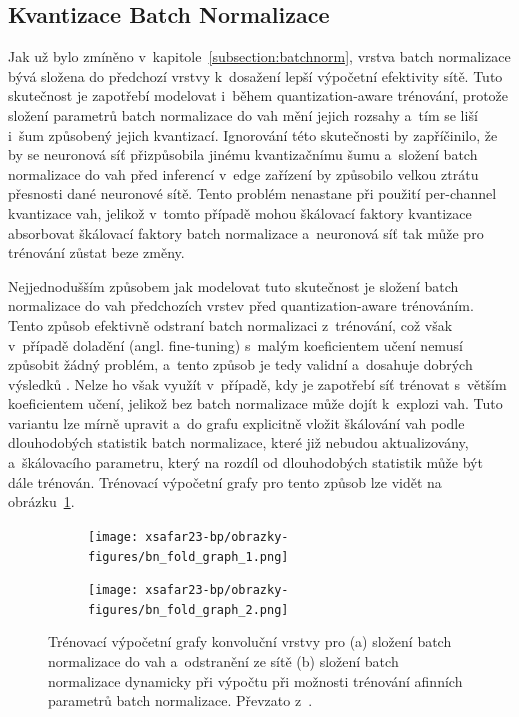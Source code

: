\subsection{Kvantizace Batch Normalizace}
\label{section:qat-batch-norm}

Jak už bylo zmíněno v~kapitole~\ref{subsection:batchnorm}, vrstva batch normalizace bývá složena do předchozí vrstvy k~dosažení lepší výpočetní efektivity sítě. Tuto skutečnost je zapotřebí modelovat i~během quantization-aware trénování, protože složení parametrů batch normalizace do vah mění jejich rozsahy a~tím se liší i~šum způsobený jejich kvantizací. Ignorování této skutečnosti by zapříčinilo, že by se neuronová síť přizpůsobila jinému kvantizačnímu šumu a~složení batch normalizace do vah před inferencí v~edge zařízení by způsobilo velkou ztrátu přesnosti dané neuronové sítě. Tento problém nenastane při použití per-channel kvantizace vah, jelikož v~tomto případě mohou škálovací faktory kvantizace absorbovat škálovací faktory batch normalizace \cite{nagel2021white} a~neuronová síť tak může pro trénování zůstat beze změny.

Nejjednodušším způsobem jak modelovat tuto skutečnost je složení batch normalizace do vah předchozích vrstev před quantization-aware trénováním. Tento způsob efektivně odstraní batch normalizaci z~trénování, což však v~případě doladění (angl. fine-tuning) s~malým koeficientem učení nemusí způsobit žádný problém, a~tento způsob je tedy validní a~dosahuje dobrých výsledků \cite{nagel2021white}. Nelze ho však využít v~případě, kdy je zapotřebí síť trénovat s~větším koeficientem učení, jelikož bez batch normalizace může dojít k~explozi vah. Tuto variantu lze mírně upravit a~do grafu explicitně vložit škálování vah podle dlouhodobých statistik batch normalizace, které již nebudou aktualizovány, a~škálovacího parametru, který na rozdíl od dlouhodobých statistik může být dále trénován. Trénovací výpočetní grafy pro tento způsob lze vidět na obrázku~\ref{fig:batch_fold_quant_static}.

\begin{figure}[H]
\centering
\begin{subfigure}{.45\linewidth}
\centering
\texttt{[image: xsafar23-bp/obrazky-figures/bn\_fold\_graph\_1.png]}
\caption[short]{}
\end{subfigure}
\begin{subfigure}{.45\linewidth}
\centering
\texttt{[image: xsafar23-bp/obrazky-figures/bn\_fold\_graph\_2.png]}
\caption[short]{}
\end{subfigure}
\caption{Trénovací výpočetní grafy konvoluční vrstvy pro (a) složení batch normalizace do vah a~odstranění ze sítě (b) složení batch normalizace dynamicky při výpočtu při možnosti trénování afinních parametrů batch normalizace. Převzato z~\cite{li2022mqbench}.}
    \label{fig:batch_fold_quant_static}
\end{figure}

